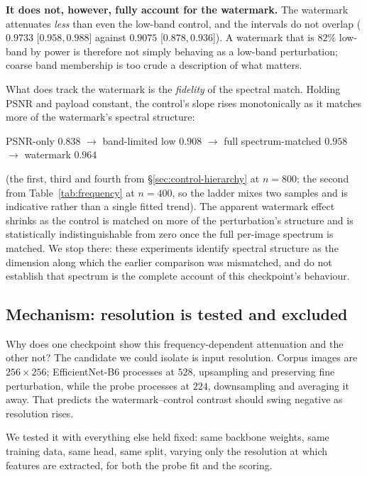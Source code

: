 \documentclass[journal]{IEEEtran}
\begin{document}
\textbf{It does not, however, fully account for the watermark.} The watermark
attenuates \emph{less} than even the low-band control, and the intervals do
not overlap ($0.9733$ [$0.958,0.988$] against $0.9075$ [$0.878,0.936$]). A
watermark that is $82\%$ low-band by power is therefore not simply behaving as
a low-band perturbation; coarse band membership is too crude a description of
what matters.

What does track the watermark is the \emph{fidelity} of the spectral match.
Holding PSNR and payload constant, the control's slope rises monotonically as
it matches more of the watermark's spectral structure:

\begin{center}
\footnotesize
PSNR-only $0.838$ $\to$ band-limited low $0.908$ $\to$
full spectrum-matched $0.958$ $\to$ watermark $0.964$
\end{center}

\noindent(the first, third and fourth from \S\ref{sec:control-hierarchy} at
$n=800$; the second from Table~\ref{tab:frequency} at $n=400$, so the ladder
mixes two samples and is indicative rather than a single fitted trend). The
apparent watermark effect shrinks as the control is matched on more of the
perturbation's structure and is statistically indistinguishable from zero once
the full per-image spectrum is matched. We stop there: these experiments
identify spectral structure as the dimension along which the earlier
comparison was mismatched, and do not establish that spectrum is the complete
account of this checkpoint's behaviour.

\subsection{Mechanism: resolution is tested and excluded}
\label{sec:mechanism}

Why does one checkpoint show this frequency-dependent attenuation and the
other not? The candidate we could isolate is input resolution. Corpus images
are $256\times256$; EfficientNet-B6 processes at $528$, upsampling and
preserving fine perturbation, while the probe processes at $224$, downsampling
and averaging it away. That predicts the watermark--control contrast should
swing negative as resolution rises.

We tested it with everything else held fixed: same backbone weights, same
training data, same head, same split, varying only the resolution at which
features are extracted, for both the probe fit and the scoring.
\end{document}
